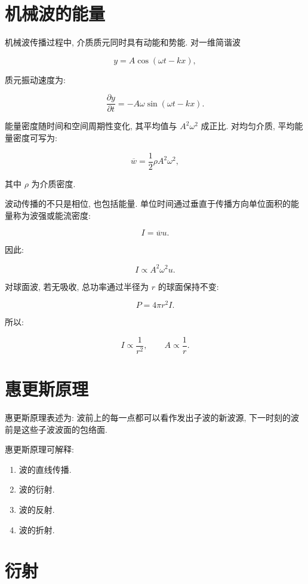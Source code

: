 \documentclass[
  a4paper,
]{ctexrep}
\providecommand{\tightlist}{%
  \setlength{\itemsep}{0pt}\setlength{\parskip}{0pt}}
\begin{document}
\section{机械波的能量}\label{ux673aux68b0ux6ce2ux7684ux80fdux91cf}

机械波传播过程中, 介质质元同时具有动能和势能. 对一维简谐波

\[
y=A\cos(\omega t-kx),
\]

质元振动速度为:

\[
\frac{\partial y}{\partial t}=-A\omega\sin(\omega t-kx).
\]

能量密度随时间和空间周期性变化, 其平均值与 \(A^2\omega^2\) 成正比.
对均匀介质, 平均能量密度可写为:

\[
\overline{w}=\frac{1}{2}\rho A^2\omega^2,
\]

其中 \(\rho\) 为介质密度.

波动传播的不只是相位, 也包括能量.
单位时间通过垂直于传播方向单位面积的能量称为波强或能流密度:

\[
I=\overline{w}u.
\]

因此:

\[
I\propto A^2\omega^2u.
\]

对球面波, 若无吸收, 总功率通过半径为 \(r\) 的球面保持不变:

\[
P=4\pi r^2I.
\]

所以:

\[
I\propto \frac{1}{r^2},\qquad A\propto \frac{1}{r}.
\]

\section{惠更斯原理}\label{ux60e0ux66f4ux65afux539fux7406}

惠更斯原理表述为: 波前上的每一点都可以看作发出子波的新波源,
下一时刻的波前是这些子波波面的包络面.

惠更斯原理可解释:

\begin{enumerate}
\def\labelenumi{\arabic{enumi}.}
\tightlist
\item
  波的直线传播.
\item
  波的衍射.
\item
  波的反射.
\item
  波的折射.
\end{enumerate}

\section{衍射}\label{ux884dux5c04}
\end{document}

